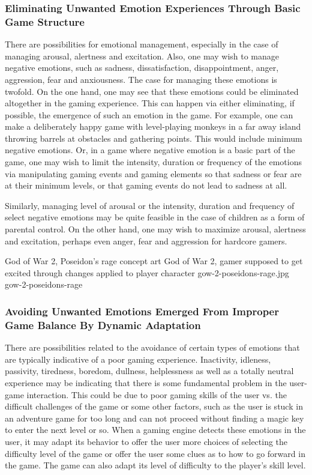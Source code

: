 \subsubsection{Eliminating Unwanted Emotion Experiences Through Basic Game Structure} There are possibilities for emotional management, especially in the case of managing arousal, alertness and excitation. Also, one may wish to manage negative emotions, such as sadness, dissatisfaction, disappointment, anger, aggression, fear and anxiousness. The case for managing these emotions is twofold. On the one hand, one may see that these emotions could be eliminated altogether in the gaming experience. This can happen via either eliminating, if possible, the emergence of such an emotion in the game. For example, one can make a deliberately happy game with level-playing monkeys in a far away island throwing barrels at obstacles and gathering points. This would include minimum negative emotions. Or, in a game where negative emotion is a basic part of the game, one may wish to limit the intensity, duration or frequency of the emotions via manipulating gaming events and gaming elements so that sadness or fear are at their minimum levels, or that gaming events do not lead to sadness at all. ~\cite{saari2005emotional}

Similarly, managing level of arousal or the intensity, duration and frequency of select negative emotions may be quite feasible in the case of children as a form of parental control. On the other hand, one may wish to maximize arousal, alertness and excitation, perhaps even anger, fear and aggression for hardcore gamers.

\largeimg
{God of War 2, Poseidon's rage concept art}
{God of War 2, gamer supposed to get excited through changes applied to player character}
{gow-2-poseidons-rage.jpg}
{gow-2-poseidons-rage}

\subsubsection{Avoiding Unwanted Emotions Emerged From Improper Game Balance By Dynamic Adaptation} There are possibilities related to the avoidance of certain types of emotions that are typically indicative of a poor gaming experience. Inactivity, idleness, passivity, tiredness, boredom, dullness, helplessness as well as a totally neutral experience may be indicating that there is some fundamental problem in the user- game interaction. This could be due to poor gaming skills of the user vs. the difficult challenges of the game or some other factors, such as the user is stuck in an adventure game for too long and can not proceed without finding a magic key to enter the next level or so. When a gaming engine detects these emotions in the user, it may adapt its behavior to offer the user more choices of selecting the difficulty level of the game or offer the user some clues as to how to go forward in the game. The game can also adapt its level of difficulty to the player's skill level. ~\cite{saari2005emotional}

